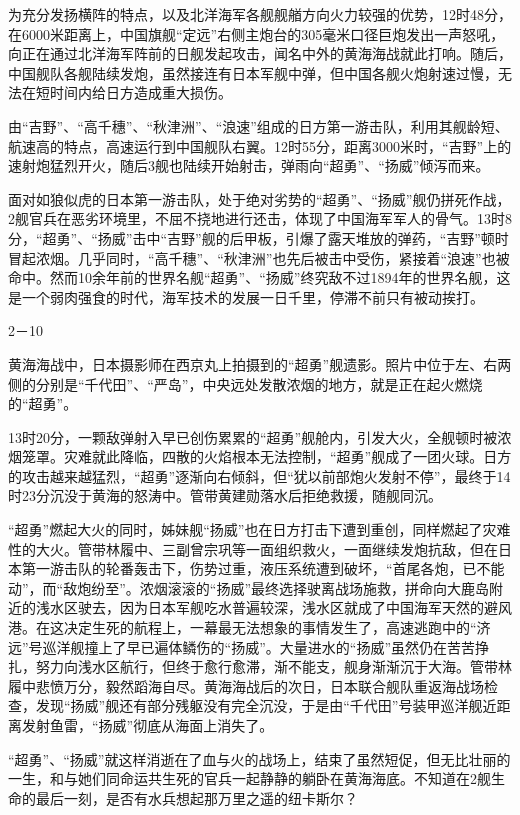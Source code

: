 \documentclass[12pt,UTF8]{ctexbook}
\begin{document}
为充分发扬横阵的特点，以及北洋海军各舰舰艏方向火力较强的优势，12时48分，在6000米距离上，中国旗舰“定远”右侧主炮台的305毫米口径巨炮发出一声怒吼，向正在通过北洋海军阵前的日舰发起攻击，闻名中外的黄海海战就此打响。随后，中国舰队各舰陆续发炮，虽然接连有日本军舰中弹，但中国各舰火炮射速过慢，无法在短时间内给日方造成重大损伤。

由“吉野”、“高千穗”、“秋津洲”、“浪速”组成的日方第一游击队，利用其舰龄短、航速高的特点，高速运行到中国舰队右翼。12时55分，距离3000米时，“吉野”上的速射炮猛烈开火，随后3舰也陆续开始射击，弹雨向“超勇”、“扬威”倾泻而来。

面对如狼似虎的日本第一游击队，处于绝对劣势的“超勇”、“扬威”舰仍拼死作战，2舰官兵在恶劣环境里，不屈不挠地进行还击，体现了中国海军军人的骨气。13时8分，“超勇”、“扬威”击中“吉野”舰的后甲板，引爆了露天堆放的弹药，“吉野”顿时冒起浓烟。几乎同时，“高千穗”、“秋津洲”也先后被击中受伤，紧接着“浪速”也被命中。然而10余年前的世界名舰“超勇”、“扬威”终究敌不过1894年的世界名舰，这是一个弱肉强食的时代，海军技术的发展一日千里，停滞不前只有被动挨打。

2－10

黄海海战中，日本摄影师在西京丸上拍摄到的“超勇”舰遗影。照片中位于左、右两侧的分别是“千代田”、“严岛”，中央远处发散浓烟的地方，就是正在起火燃烧的“超勇”。

13时20分，一颗敌弹射入早已创伤累累的“超勇”舰舱内，引发大火，全舰顿时被浓烟笼罩。灾难就此降临，四散的火焰根本无法控制，“超勇”舰成了一团火球。日方的攻击越来越猛烈，“超勇”逐渐向右倾斜，但“犹以前部炮火发射不停”，最终于14时23分沉没于黄海的怒涛中。管带黄建勋落水后拒绝救援，随舰同沉。

“超勇”燃起大火的同时，姊妹舰“扬威”也在日方打击下遭到重创，同样燃起了灾难性的大火。管带林履中、三副曾宗巩等一面组织救火，一面继续发炮抗敌，但在日本第一游击队的轮番轰击下，伤势过重，液压系统遭到破坏，“首尾各炮，已不能动”，而“敌炮纷至”。浓烟滚滚的“扬威”最终选择驶离战场施救，拼命向大鹿岛附近的浅水区驶去，因为日本军舰吃水普遍较深，浅水区就成了中国海军天然的避风港。在这决定生死的航程上，一幕最无法想象的事情发生了，高速逃跑中的“济远”号巡洋舰撞上了早已遍体鳞伤的“扬威”。大量进水的“扬威”虽然仍在苦苦挣扎，努力向浅水区航行，但终于愈行愈滞，渐不能支，舰身渐渐沉于大海。管带林履中悲愤万分，毅然蹈海自尽。黄海海战后的次日，日本联合舰队重返海战场检查，发现“扬威”舰还有部分残躯没有完全沉没，于是由“千代田”号装甲巡洋舰近距离发射鱼雷，“扬威”彻底从海面上消失了。

“超勇”、“扬威”就这样消逝在了血与火的战场上，结束了虽然短促，但无比壮丽的一生，和与她们同命运共生死的官兵一起静静的躺卧在黄海海底。不知道在2舰生命的最后一刻，是否有水兵想起那万里之遥的纽卡斯尔？
\end{document}
